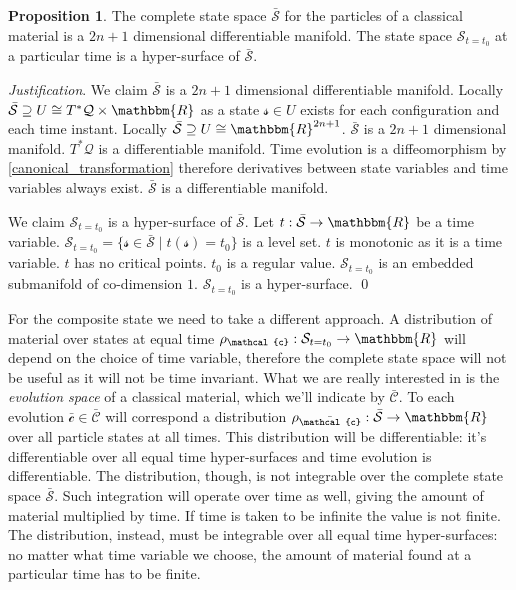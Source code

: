 \documentclass[aps,pra,10pt,twocolumn,floatfix,nofootinbib]{revtex4-1}
\numberwithin{equation}{section}
\theoremstyle{definition}
\newtheorem{prop}[equation]{Proposition}
\newenvironment{justification}{\emph{Justification}.}{\qed}
\begin{document}
\begin{prop}\label{complete_particle_state_space}
	The complete state space $\bar{\mathcal{S}}$ for the particles of a classical material is a $2n+1$ dimensional differentiable manifold. The state space $\mathcal{S}_{t=t_0}$ at a particular time is a hyper-surface of $\bar{\mathcal{S}}$.
\end{prop}

\begin{justification}
	We claim $\bar{\mathcal{S}}$ is a $2n+1$ dimensional differentiable manifold. Locally $\bar{\mathcal{S}} \supseteq U \cong T^*\mathcal{Q}\times \mathbbm{R}$ as a state $\mathcal{s} \in U$ exists for each configuration and each time instant. Locally $\bar{\mathcal{S}} \supseteq U \cong\mathbbm{R}^{2n+1}$. $\bar{\mathcal{S}}$ is a $2n+1$ dimensional manifold. $T^*\mathcal{Q}$ is a differentiable manifold. Time evolution is a diffeomorphism by \ref{canonical_transformation} therefore derivatives between state variables and time variables always exist. $\bar{\mathcal{S}}$ is a differentiable manifold.
	
	We claim $\mathcal{S}_{t=t_0}$ is a hyper-surface of $\bar{\mathcal{S}}$. Let $t : \bar{\mathcal{S}} \rightarrow \mathbbm{R}$ be a time variable. $\mathcal{S}_{t=t_0} = \{ \mathcal{s} \in \bar{\mathcal{S}} \; | \; t(\mathcal{s}) = t_0 \}$ is a level set. $t$ is monotonic as it is a time variable. $t$ has no critical points. $t_0$ is a regular value. $\mathcal{S}_{t=t_0}$ is an embedded submanifold of co-dimension $1$. $\mathcal{S}_{t=t_0}$ is a hyper-surface.
\end{justification}

For the composite state we need to take a different approach. A distribution of material over states at equal time $\rho_\mathcal{c} : \mathcal{S}_{t=t_0} \rightarrow \mathbbm{R}$ will depend on the choice of time variable, therefore the complete state space will not be useful as it will not be time invariant. What we are really interested in is the \emph{evolution space} of a classical material, which we'll indicate by $\bar{\mathcal{C}}$. To each evolution $\bar{\mathcal{c}} \in \bar{\mathcal{C}}$ will correspond a distribution $\rho_{\bar{\mathcal{c}}} : \bar{\mathcal{S}} \rightarrow \mathbbm{R}$ over all particle states at all times. This distribution will be differentiable: it's differentiable over all equal time hyper-surfaces and time evolution is differentiable. The distribution, though, is not integrable over the complete state space $\bar{\mathcal{S}}$. Such integration will operate over time as well, giving the amount of material multiplied by time. If time is taken to be infinite the value is not finite. The distribution, instead, must be integrable over all equal time hyper-surfaces: no matter what time variable we choose, the amount of material found at a particular time has to be finite.
\end{document}
